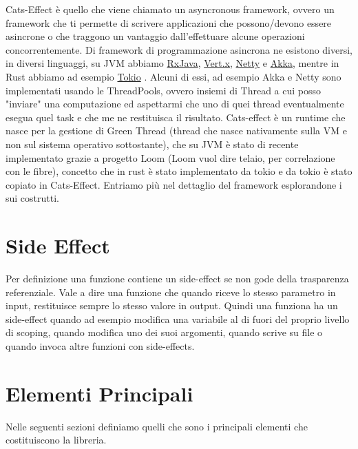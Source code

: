 Cats-Effect è quello che viene chiamato un asyncronous framework, ovvero un framework che ti permette di scrivere applicazioni che possono/devono essere asincrone o che traggono un vantaggio dall'effettuare alcune operazioni concorrentemente.  Di framework di programmazione asincrona ne esistono diversi, in diversi linguaggi, su JVM abbiamo \href{https://github.com/ReactiveX/RxJava}{RxJava}, \href{https://vertx.io/}{Vert.x}, \href{https://netty.io/}{Netty} e \href{https://akka.io/}{Akka}, mentre in Rust abbiamo ad esempio \href{https://tokio.rs/}{Tokio} . Alcuni di essi, ad esempio Akka e Netty sono implementati usando le ThreadPools, ovvero insiemi di Thread a cui posso "inviare" una computazione ed aspettarmi che uno di quei thread eventualmente esegua quel task e che me ne restituisca il risultato. Cats-effect è un runtime che nasce per la gestione di Green Thread (thread che nasce nativamente sulla VM e non sul sistema operativo sottostante), che su JVM è stato di recente implementato grazie a progetto Loom (Loom vuol dire telaio, per correlazione con le fibre), concetto che in rust è stato implementato da tokio e da tokio è stato copiato in Cats-Effect. Entriamo più nel dettaglio del framework esplorandone i sui costrutti. 

\section{Side Effect}
Per definizione una funzione contiene un side-effect se non gode della trasparenza referenziale. Vale a dire una funzione che quando riceve lo stesso parametro in input, restituisce sempre lo stesso valore in output. Quindi una funziona ha un side-effect quando ad esempio modifica una variabile al di fuori del proprio livello di scoping, quando modifica uno dei suoi argomenti, quando scrive su file o quando invoca altre funzioni con side-effects.

\section{Elementi Principali}
Nelle seguenti sezioni definiamo quelli che sono i principali elementi che costituiscono la libreria.
